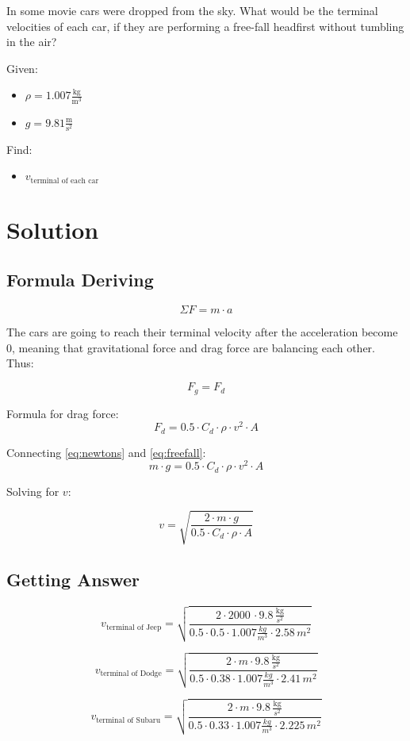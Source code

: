 
In some movie cars were dropped from the sky.
What would be the terminal velocities of each car, if they are
performing a free-fall headfirst without tumbling in the air?

\bigbreak Given:
\begin{itemize}
    \item $ \rho = 1.007 \frac{\text{kg}}{\text{m}^3} $
    \item $ g = 9.81 \frac{\text{m}}{\text{s}^2} $
\end{itemize}

Find:
\begin{itemize}
    \item $ v_{\text{terminal of each car}} $
\end{itemize}


\section*{Solution}
\subsection*{Formula Deriving}

\begin{equation}
    \label{eq:newtons}
    \Sigma F = m \cdot a
\end{equation}

The cars are going to reach their terminal velocity after the acceleration become 0,
meaning that gravitational force and drag force are balancing each other. Thus:

$$ F_g = F_d $$

Formula for drag force:
\begin{equation}
    \label{eq:freefall}
    F_d = 0.5 \cdot C_d \cdot \rho \cdot v^2 \cdot A
\end{equation}

Connecting \ref{eq:newtons} and \ref{eq:freefall}:
$$m \cdot g = 0.5 \cdot C_d \cdot \rho \cdot v^2 \cdot A $$

Solving for $v$:

\begin{equation}
    \label{eq:terminal}
    v = \sqrt{\frac{2 \cdot m \cdot g}{0.5 \cdot C_d \cdot \rho \cdot A}}
\end{equation}

\subsection*{Getting Answer}

$$ v_{\text{terminal of Jeep}} = \sqrt{\frac{2 \cdot 2000 \,  \cdot 9.8 \, \frac{\text{kg}}{s^2}}{0.5 \cdot 0.5 \cdot 1.007 \frac{kg}{m^3} \cdot 2.58 \, m^2}} $$

$$ v_{\text{terminal of Dodge}} = \sqrt{\frac{2 \cdot m \cdot 9.8 \, \frac{\text{kg}}{s^2}}{0.5 \cdot 0.38 \cdot 1.007 \frac{kg}{m^3} \cdot 2.41 \, m^2}} $$

$$ v_{\text{terminal of Subaru}} = \sqrt{\frac{2 \cdot m \cdot 9.8 \, \frac{\text{kg}}{s^2}}{0.5 \cdot 0.33 \cdot 1.007 \frac{kg}{m^3} \cdot 2.225 \, m^2}} $$

